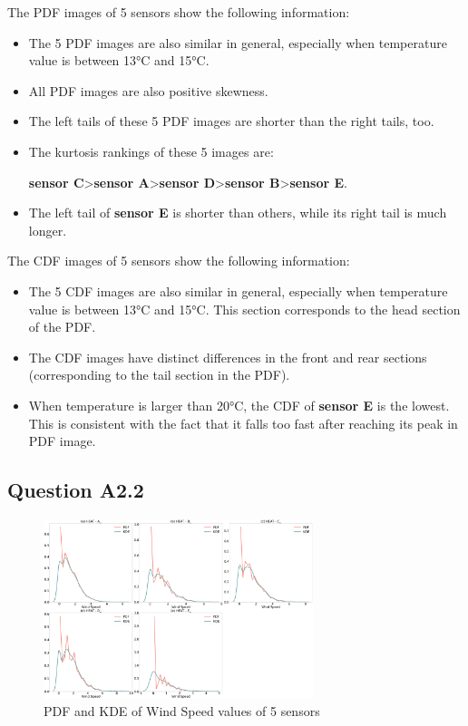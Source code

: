 \documentclass[a4paper]{article}
\begin{document}
\noindent The PDF images of 5 sensors show the following information:
\begin{itemize}
    \item The 5 PDF images are also similar in general, especially when temperature value is between 13°C and 15°C.
    \item All PDF images are also positive skewness.
    \item The left tails of these 5 PDF images are shorter than the right tails, too.
    \item The kurtosis rankings of these 5 images are:
    
    \textbf{sensor C}>\textbf{sensor A}>\textbf{sensor D}>\textbf{sensor B}>\textbf{sensor E}.
    \item The left tail of \textbf{sensor E} is shorter than others, while its right tail is much longer.
\end{itemize}

\noindent The CDF images of 5 sensors show the following information:
\begin{itemize}
    \item The 5 CDF images are also similar in general, especially when temperature value is between 13°C and 15°C. This section corresponds to the head section of the PDF. 
    \item The CDF images have distinct differences in the front and rear sections (corresponding to the tail section in the PDF).
    \item When temperature is larger than 20°C, the CDF of \textbf{sensor E} is the lowest. This is consistent with the fact that it falls too fast after reaching its peak in PDF image.
\end{itemize}

\subsection{Question A2.2}
\begin{figure}[htbp]
\centering
\includegraphics[width=0.7\textwidth]{images/pdf_and_kde_WS.png} 
\caption{PDF and KDE of Wind Speed values of 5 sensors}
\end{figure}
\end{document}
